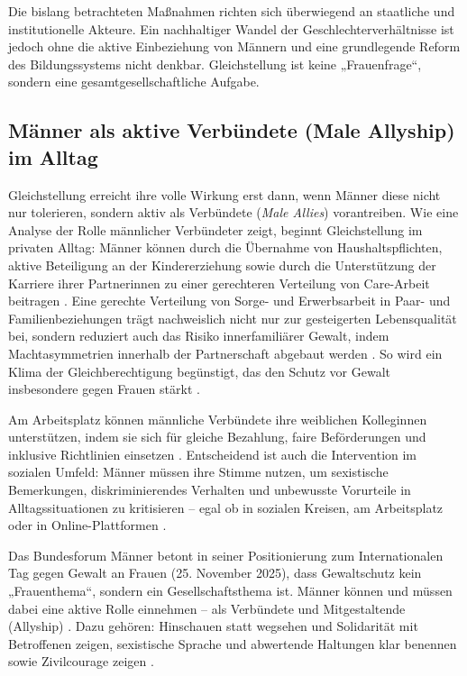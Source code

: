 \documentclass[12pt,a4paper]{article}
\begin{document}
	Die bislang betrachteten Maßnahmen richten sich überwiegend an staatliche und institutionelle Akteure. Ein nachhaltiger Wandel der Geschlechterverhältnisse ist jedoch ohne die aktive Einbeziehung von Männern und eine grundlegende Reform des Bildungssystems nicht denkbar. Gleichstellung ist keine „Frauenfrage“, sondern eine gesamtgesellschaftliche Aufgabe.
	
	\subsection{Männer als aktive Verbündete (Male Allyship) im Alltag}
	
	Gleichstellung erreicht ihre volle Wirkung erst dann, wenn Männer diese nicht nur tolerieren, sondern aktiv als Verbündete (\textit{Male Allies}) vorantreiben. Wie eine Analyse der Rolle männlicher Verbündeter zeigt, beginnt Gleichstellung im privaten Alltag: Männer können durch die Übernahme von Haushaltspflichten, aktive Beteiligung an der Kindererziehung sowie durch die Unterstützung der Karriere ihrer Partnerinnen zu einer gerechteren Verteilung von Care-Arbeit beitragen \cite{male_allies}. Eine gerechte Verteilung von Sorge- und Erwerbsarbeit in Paar- und Familienbeziehungen trägt nachweislich nicht nur zur gesteigerten Lebensqualität bei, sondern reduziert auch das Risiko innerfamiliärer Gewalt, indem Machtasymmetrien innerhalb der Partnerschaft abgebaut werden \cite{bundesforum_gewalt}. So wird ein Klima der Gleichberechtigung begünstigt, das den Schutz vor Gewalt insbesondere gegen Frauen stärkt \cite{bundesforum_gewalt}.
	
	Am Arbeitsplatz können männliche Verbündete ihre weiblichen Kolleginnen unterstützen, indem sie sich für gleiche Bezahlung, faire Beförderungen und inklusive Richtlinien einsetzen \cite{male_allies}. Entscheidend ist auch die Intervention im sozialen Umfeld: Männer müssen ihre Stimme nutzen, um sexistische Bemerkungen, diskriminierendes Verhalten und unbewusste Vorurteile in Alltagssituationen zu kritisieren – egal ob in sozialen Kreisen, am Arbeitsplatz oder in Online-Plattformen \cite{male_allies}.
	
	Das Bundesforum Männer betont in seiner Positionierung zum Internationalen Tag gegen Gewalt an Frauen (25. November 2025), dass Gewaltschutz kein „Frauenthema“, sondern ein Gesellschaftsthema ist. Männer können und müssen dabei eine aktive Rolle einnehmen – als Verbündete und Mitgestaltende (Allyship) \cite{bundesforum_gewalt}. Dazu gehören: Hinschauen statt wegsehen und Solidarität mit Betroffenen zeigen, sexistische Sprache und abwertende Haltungen klar benennen sowie Zivilcourage zeigen \cite{bundesforum_gewalt}.
	
\end{document}
